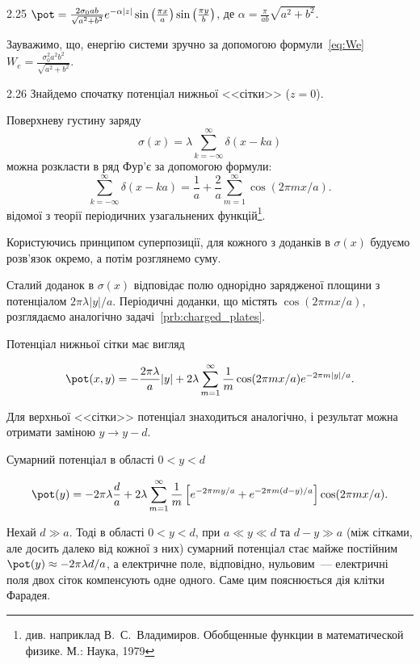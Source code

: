 \begin{Solution}{2.{25}}
	$\pot  = \frac{{2{\sigma _0}ab}}{{\sqrt {{a^2} + {b^2}} }}{e^{ - \alpha |z|}}\sin \left( {\frac{{\pi x}}{a}} \right)\sin \left( {\frac{{\pi y}}{b}} \right)$, де $\alpha  = \frac{\pi }{{ab}}\sqrt {{a^2} + {b^2}}$.

    Зауважимо, що, енергію системи зручно за допомогою формули~\eqref{eq:We}
	$W_e =  \frac{{\sigma _0^2{a^2}{b^2}}}{{\sqrt {{a^2} + {b^2}} }}$.
\end{Solution}
\begin{Solution}{2.{26}}
	Знайдемо спочатку потенціал нижньої <<сітки>> ($z = 0$).

Поверхневу густину заряду
\[
    \sigma(x) = \lambda\sum\limits_{k = -\infty}^{\infty} \delta(x - ka)
\]
можна розкласти в ряд Фур'є за допомогою формули:
	\[
		\sum\limits_{k = -\infty}^{\infty} \delta(x - ka) =  \frac{1}{a} + \frac{2}{a}\sum\limits_{m=1}^{\infty}\cos(2\pi mx/a).
	\]
відомої з теорії періодичних узагальнених функцій\footnote{див. наприклад В.~С.~Владимиров. Обобщенные функции в математической физике. М.: Наука, 1979}.

Користуючись принципом суперпозиції, для кожного з доданків в $\sigma(x)$  будуємо розв’язок окремо, а потім розглянемо суму.

Сталий доданок в $\sigma(x)$  відповідає полю однорідно зарядженої площини з потенціалом $2\pi\lambda|y|/a$. Періодичні доданки, що містять $\cos(2\pi mx/a)$, розглядаємо аналогічно задачі~\ref{prb:charged_plates}.

Потенціал нижньої сітки має вигляд


	\[
		\pot(x,y) = -\frac{2\pi\lambda}{a}|y| + 2\lambda\sum\limits_{m = 1}^{\infty} \frac1m \cos(2\pi mx/a)e^{-2\pi m|y|/a}.
	\]

	Для верхньої  <<сітки>> потенціал знаходиться аналогічно, і результат можна отримати заміною $y \to y - d$.

    Сумарний потенціал в області $0 < y <d$


	\[
		\pot(y) = -2\pi\lambda\frac{d}{a} + 2\lambda\sum\limits_{m = 1}^{\infty} \frac1m \left[ e^{-2\pi my/a} +  e^{-2\pi m (d - y)/a} \right] \cos(2\pi mx/a).
	\]

Нехай $d \gg a$. Тоді в області $0<y<d$, при $a \ll y \ll d$ та $d - y \gg a$ (між сітками, але досить далеко від кожної з них) сумарний потенціал стає майже постійним $\pot(y) \approx  - 2\pi \lambda d/a$, а електричне поле, відповідно, нульовим~--- електричні поля двох сіток компенсують одне одного.  Саме цим пояснюється дія клітки Фарадея.

\end{Solution}
